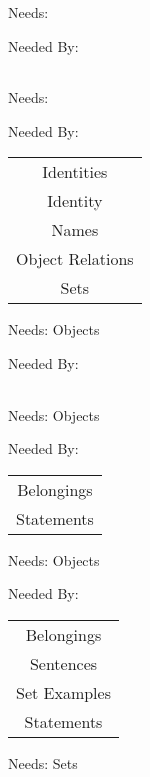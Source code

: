 
\newpage
\label{letters}


\clearpage
Needs: 

Needed By: \begin{tabular}{c}
\end{tabular}
\clearpage{}

\newpage
\label{objects}


\clearpage
Needs: 

Needed By: \begin{tabular}{c} Identities \\  Identity \\  Names \\  Object Relations \\  Sets \\ 
\end{tabular}
\clearpage{}

\newpage
\label{names}


\clearpage
Needs:  Objects 

Needed By: \begin{tabular}{c}
\end{tabular}
\clearpage{}

\newpage
\label{identities}


\clearpage
Needs:  Objects 

Needed By: \begin{tabular}{c} Belongings \\  Statements \\ 
\end{tabular}
\clearpage{}

\newpage
\label{sets}


\clearpage
Needs:  Objects 

Needed By: \begin{tabular}{c} Belongings \\  Sentences \\  Set Examples \\  Statements \\ 
\end{tabular}
\clearpage{}

\newpage
\label{set_examples}


\clearpage
Needs:  Sets 

